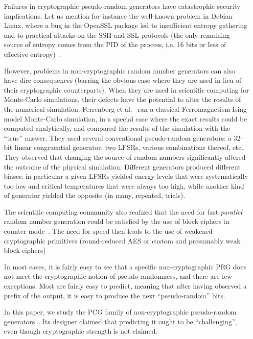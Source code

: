 \documentclass[submission,svgnames,journal=tosc]{iacrtrans}
\begin{document}
Failures in cryptographic pseudo-random generators have catastrophic security
implications. Let us mention for instance the well-known problem in Debian
Linux, where a bug in the OpenSSL package led to insufficient entropy gathering
and to practical attacks on the SSH and SSL protocols (the only remaining source
of entropy comes from the PID of the process, i.e. 16 bits or less of effective
entropy)~\cite{YilekRSES09}.

However, problems in non-cryptographic random number generators can also have
dire consequences (barring the obvious case where they are used in lieu of their
cryptographic counterparts). When they are used in scientific computing for
Monte-Carlo simulations, their defects have the potential to alter the results
of the numerical simulation. Ferrenberg et al.~\cite{Ferrenberg92} ran a
classical Ferromagnetism Ising model Monte-Carlo simulation, in a special case
where the exact results could be computed analytically, and compared the results
of the simulation with the ``true'' answer. They used several conventional
pseudo-random generators: a 32-bit linear congruential generator, two LFSRs,
various combinations thereof, etc. They observed that changing the source of
random numbers significantly altered the outcome of the physical
simulation. Different generators produced different biases: in particular a
given LFSRs yielded energy levels that were systematically too low and critical
temperatures that were always too high, while another kind of generator yielded
the opposite (in many, repeated, trials).

The scientific computing community also realized that the need for fast
\emph{parallel} random number generation could be satisfied by the use of block
ciphers in counter mode~\cite{Salmon11}. The need for speed then leads to the
use of weakened cryptographic primitives (round-reduced AES or custom and
presumably weak block-ciphers)

In most cases, it is fairly easy to see that a specific non-cryptographic PRG
does not meet the cryptographic notion of pseudo-randomness, and there are few
exceptions. Most are fairly easy to predict, meaning that after having observed
a prefix of the output, it is easy to produce the next ``pseudo-random''
bits.

In this paper, we study the \textsf{PCG} family of non-cryptographic
pseudo-random generators~\cite{melissapaper,melissaweb}. Its designer claimed
that predicting it ought to be ``challenging'', even though cryptographic
strength is not claimed.
\end{document}
